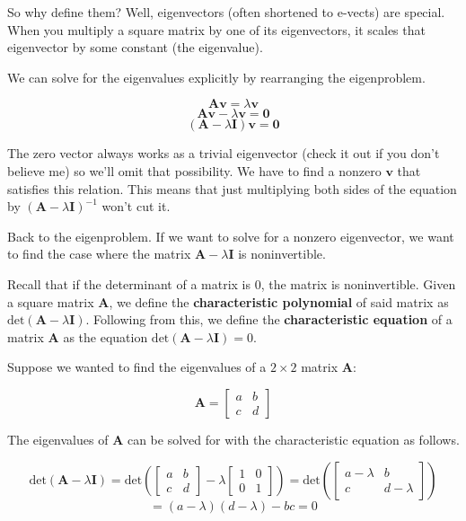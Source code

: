 \documentclass[
  letterpaper,
  DIV=11,
  numbers=noendperiod]{scrreprt}
\begin{document}
So why define them? Well, eigenvectors (often shortened to e-vects) are
special. When you multiply a square matrix by one of its eigenvectors,
it scales that eigenvector by some constant (the eigenvalue).

We can solve for the eigenvalues explicitly by rearranging the
eigenproblem.

\[\textbf{A} \boldsymbol{v} = \lambda \boldsymbol{v}\]
\[\textbf{A} \boldsymbol{v} - \lambda \boldsymbol{v} = \boldsymbol{0}\]
\[(\textbf{A} - \lambda \textbf{I}) \boldsymbol{v} = \boldsymbol{0}\]

The zero vector always works as a trivial eigenvector (check it out if
you don't believe me) so we'll omit that possibility. We have to find a
nonzero \(\boldsymbol{v}\) that satisfies this relation. This means that
just multiplying both sides of the equation by
\((\textbf{A} - \lambda \textbf{I})^{-1}\) won't cut it.

Back to the eigenproblem. If we want to solve for a nonzero eigenvector,
we want to find the case where the matrix
\(\textbf{A} - \lambda \textbf{I}\) is noninvertible.

Recall that if the determinant of a matrix is 0, the matrix is
noninvertible. Given a square matrix \(\textbf{A}\), we define the
\textbf{characteristic polynomial} of said matrix as
\(\text{det}(\textbf{A} - \lambda \textbf{I})\). Following from this, we
define the \textbf{characteristic equation} of a matrix \(\textbf{A}\)
as the equation \(\text{det}(\textbf{A} - \lambda \textbf{I})=0\).

Suppose we wanted to find the eigenvalues of a \(2\times2\) matrix
\(\textbf{A}\):

\[\textbf{A} = \begin{bmatrix} a & b \\ c & d \end{bmatrix}\]

The eigenvalues of \(\textbf{A}\) can be solved for with the
characteristic equation as follows.

\[\text{det}\left(\textbf{A} - \lambda \textbf{I} \right) = \text{det}\left(\begin{bmatrix} a & b \\ c & d \end{bmatrix} - \lambda \begin{bmatrix} 1 & 0 \\ 0 & 1 \end{bmatrix}\right) = \text{det}\left(\begin{bmatrix} a - \lambda & b \\ c & d - \lambda \end{bmatrix} \right) \]
\[= (a-\lambda)(d-\lambda)-bc = 0\]
\end{document}
